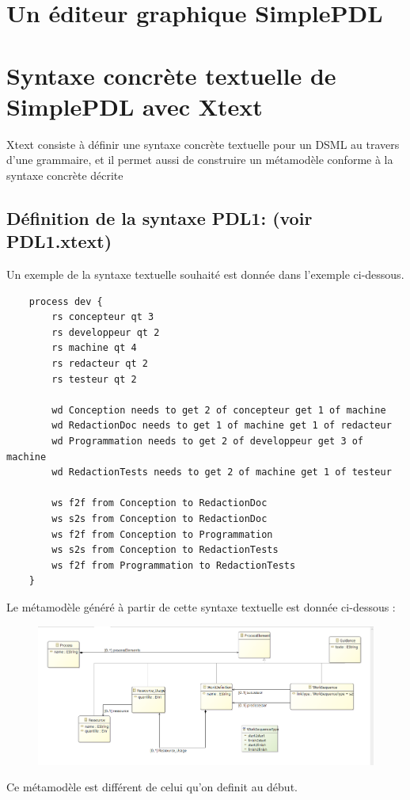 \documentclass{article}
\begin{document}
\section{Un éditeur graphique SimplePDL}

\section{Syntaxe concrète textuelle de SimplePDL avec Xtext}
Xtext consiste à définir une syntaxe concrète textuelle pour un DSML au travers d’une grammaire, et il permet aussi 
de construire un métamodèle conforme à la syntaxe concrète décrite 
\subsection{Définition de la syntaxe PDL1: (voir \textbf{PDL1.xtext})}
Un exemple de la syntaxe textuelle souhaité est donnée dans l'exemple ci-dessous.
\begin{verbatim}
    process dev {
        rs concepteur qt 3
        rs developpeur qt 2
        rs machine qt 4
        rs redacteur qt 2
        rs testeur qt 2
        
        wd Conception needs to get 2 of concepteur get 1 of machine
        wd RedactionDoc needs to get 1 of machine get 1 of redacteur
        wd Programmation needs to get 2 of developpeur get 3 of machine
        wd RedactionTests needs to get 2 of machine get 1 of testeur
        
        ws f2f from Conception to RedactionDoc
        ws s2s from Conception to RedactionDoc
        ws f2f from Conception to Programmation
        ws s2s from Conception to RedactionTests
        ws f2f from Programmation to RedactionTests
    }
\end{verbatim}
Le métamodèle généré à partir de cette syntaxe textuelle est donnée ci-dessous : 
\begin{figure}[H]
    \centering
    \includegraphics[width = 18cm]{SimplePDLXtext.png}
\end{figure}
Ce métamodèle est différent de celui qu'on definit au début.
\end{document}
